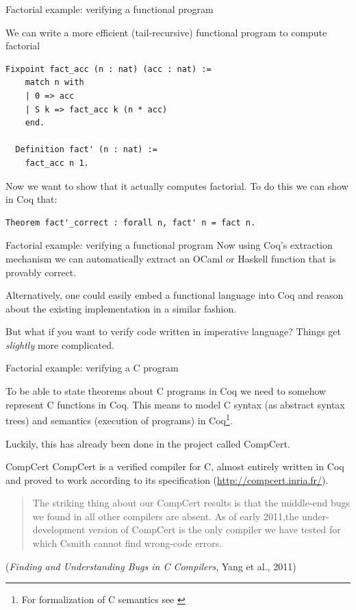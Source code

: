 \documentclass[10pt]{beamer}
\begin{document}
\begin{frame}[fragile]{Factorial example: verifying a functional program}

  We can write a more efficient (tail-recursive) functional program to compute factorial

  \begin{lstlisting}[language=Coq]
  Fixpoint fact_acc (n : nat) (acc : nat) :=
    match n with
    | 0 => acc
    | S k => fact_acc k (n * acc)
    end.

  Definition fact' (n : nat) :=
    fact_acc n 1.

  \end{lstlisting}

  Now we want to show that it actually computes factorial. To do this we can show in Coq that:
   \begin{lstlisting}[language=Coq]
  Theorem fact'_correct : forall n, fact' n = fact n.
  \end{lstlisting}

   
\end{frame}

\begin{frame}{Factorial example: verifying a functional program}
  Now using Coq's extraction mechanism we can automatically extract an OCaml or Haskell function that is provably correct.

  Alternatively, one could easily embed a functional language into Coq and reason about the existing implementation in a similar fashion.

  But what if you want to verify code written in imperative language? Things get \emph{slightly} more complicated.
\end{frame}


\begin{frame}{Factorial example: verifying a C program}

    To be able to state theorems about C programs in Coq we need to somehow represent C functions in Coq. This means  to model C syntax (as abstract syntax trees) and semantics (execution of programs) in Coq\footnote{For formalization of C semantics see \cite{Blazy09mechanizedsemantics}}.

    Luckily, this has already been done in the project called CompCert.
    \end{frame}
    
    \begin{frame}{CompCert}
    CompCert is a verified compiler for C, almost entirely written in Coq and proved to work according to its specification (\url{http://compcert.inria.fr/}).

    \begin{quote}
      The striking thing about our CompCert results is that the middle-end bugs we found in all other compilers are absent. As of early 2011,the under-development version of CompCert is the only compiler we have tested for which Csmith cannot find wrong-code errors.
    \end{quote} ({\it Finding and Understanding Bugs in C Compilers}, Yang et al., 2011)

\end{frame}
    
\end{document}
